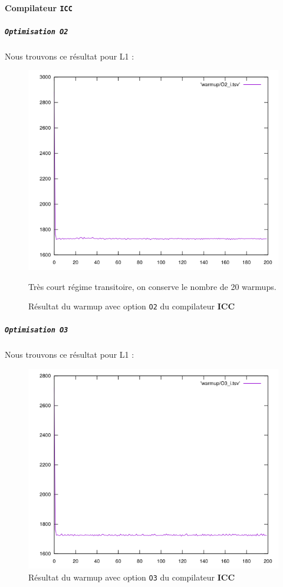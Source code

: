 \documentclass{report}
\begin{document}
\paragraph{Compilateur \texttt{ICC\textsuperscript \textcopyright}}
    \subparagraph{ \texttt{Optimisation O2}}
  Nous trouvons ce résultat pour L1 :
  \begin{figure}[ht!]
    \centering
\includegraphics[scale=0.45]{resources/L1/warmup/O2_i.png}
    \caption{Résultat du warmup avec option \texttt{O2} du compilateur \textbf{ICC}}

	Très court régime transitoire, on conserve le nombre de 20 warmups.
  \end{figure}
  \newpage
\subparagraph{ \texttt{Optimisation O3}}
Nous trouvons ce résultat pour L1 :
\begin{figure}[ht!]
  \centering
  \includegraphics[scale=0.45]{resources/L1/warmup/O3_i.png}
  \caption{Résultat du warmup avec option \texttt{O3} du compilateur \textbf{ICC}}
\end{figure}
\end{document}
